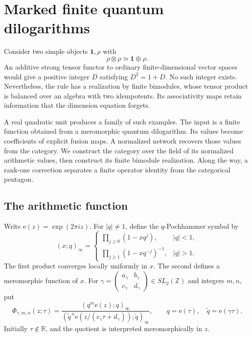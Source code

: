 \chapter{Marked finite quantum dilogarithms}
\label{v4-arith:mf:chapter}

Consider two simple objects \(\mathbf1,\rho\) with
\[
 \rho\otimes\rho\simeq\mathbf1\oplus\rho.
\]
An additive strong tensor functor to ordinary finite-dimensional vector
spaces would give a positive integer \(D\) satisfying \(D^2=1+D\).
No such integer exists. Nevertheless, the rule has a realization by
finite bimodules, whose tensor product is balanced over an algebra
with two idempotents. Its associativity maps retain information that
the dimension equation forgets.

A real quadratic unit produces a family of such examples. The input
is a finite function obtained from a meromorphic quantum
dilogarithm. Its values become coefficients of explicit fusion maps.
A normalized network recovers those values from the category.
We construct the category over the field of its normalized arithmetic
values, then construct its finite bimodule realization. Along the way,
a rank-one correction separates a finite operator identity from the
categorical pentagon.

\section{The arithmetic function}
\label{v4-arith:mf:arithmetic}

Write \(\mathrm e(z)=\exp(2\pi iz)\).
For \(|q|\ne1\), define the \(q\)-Pochhammer symbol by
\[
 (x;q)_\infty=
 \begin{cases}
  \displaystyle\prod_{j\ge0}(1-xq^j),&|q|<1,\\[2mm]
  \displaystyle\prod_{j\ge1}(1-xq^{-j})^{-1},&|q|>1.
 \end{cases}
\]
The first product converges locally uniformly in \(x\).
The second defines a meromorphic function of \(x\).
For
\(\gamma=\left(\begin{smallmatrix}a_\gamma&b_\gamma\\
c_\gamma&d_\gamma\end{smallmatrix}\right)\in SL_2(\mathbb Z)\)
and integers \(m,n\), put
\begin{equation}\label{v4-arith:mf:modular-quotient}
 \Phi_{\gamma,m,n}(z;\tau)
 =
 \frac{(q^m\mathrm e(z);q)_\infty}
 {(\widetilde q^{\,n}
       \mathrm e(z/(c_\gamma\tau+d_\gamma));\widetilde q)_\infty},
 \qquad
 q=\mathrm e(\tau),\quad
 \widetilde q=\mathrm e(\gamma\tau).
\end{equation}
Initially \(\tau\notin\mathbb R\), and the quotient is interpreted
meromorphically in \(z\).

